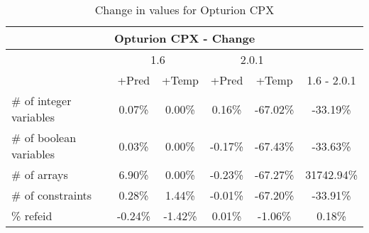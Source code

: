 \documentclass{standalone}
\begin{document}
\begin{table}[H]
\footnotesize
\centering
\begin{tabular}{lc|c|c|c|c}
\multicolumn{6}{c}{Opturion CPX - Change} \\ 
\hline\hline  & \multicolumn{2}{c|}{1.6} &\multicolumn{2}{c|}{2.0.1} &\\ 
\hline  & +Pred & +Temp & +Pred & +Temp & 1.6 - 2.0.1\\
\# of integer variables & 0.07\% & 0.00\% & 0.16\% & -67.02\% & -33.19\% \\ 
\# of boolean variables & 0.03\% & 0.00\% & -0.17\% & -67.43\% & -33.63\% \\ 
\# of arrays            & 6.90\% & 0.00\% & -0.23\% & -67.27\% & 31742.94\% \\
\# of constraints       & 0.28\% & 1.44\% & -0.01\% & -67.20\% & -33.91\% \\ 
\% refeid               & -0.24\% & -1.42\% & 0.01\% & -1.06\% & 0.18\%\\ 
\end{tabular}\caption{Change in values for Opturion CPX}
\end{table}
\end{document}

